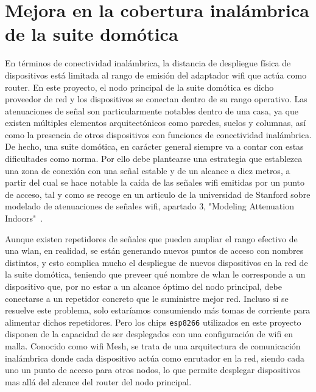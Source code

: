 \section{Mejora en la cobertura inalámbrica de la suite domótica}
\label{ch:Capitulo6.2}

En términos de conectividad inalámbrica, la distancia de despliegue física de dispositivos está limitada al rango de emisión del adaptador \gls{wifi} que actúa como router. En este proyecto, el nodo principal de la suite domótica es dicho proveedor de red y los dispositivos se conectan dentro de su rango operativo. Las atenuaciones de señal son particularmente notables dentro de una casa, ya que existen múltiples elementos arquitectónicos como paredes, suelos y columnas, así como la presencia de otros dispositivos con funciones de conectividad inalámbrica. De hecho, una suite domótica, en carácter general siempre va a contar con estas dificultades como norma. Por ello debe plantearse una estrategia que establezca una zona de conexión con una señal estable y de un alcance a diez metros, a partir del cual se hace notable la caída de las señales \gls{wifi} emitidas por un punto de acceso, tal y como se recoge en un articulo de la universidad de Stanford sobre modelado de atenuaciones de señales \gls{wifi}, apartado 3, "Modeling Attenuation Indoors"~\cite{faria2005modeling}.

\vspace{1cm}

Aunque existen repetidores de señales que pueden ampliar el rango efectivo de una \gls{wlan}, en realidad, se están generando nuevos puntos de acceso con nombres distintos, y esto complica mucho el despliegue de nuevos dispositivos en la red de la suite domótica, teniendo que preveer qué nombre de \gls{wlan} le corresponde a un dispositivo que, por no estar a un alcance óptimo del nodo principal, debe conectarse a un repetidor concreto que le suministre mejor red. Incluso si se resuelve este problema, solo estaríamos consumiendo más tomas de corriente para alimentar dichos repetidores. Pero los chips \verb|esp8266| utilizados en este proyecto disponen de la capacidad de ser desplegados con una configuración de \gls{wifi} en malla. Conocido como \gls{wifi} Mesh, se trata de una arquitectura de comunicación inalámbrica donde cada dispositivo actúa como enrutador en la red, siendo cada uno un punto de acceso para otros nodos, lo que permite desplegar dispositivos mas allá del alcance del router del nodo principal.

